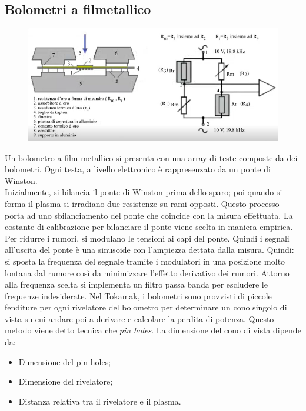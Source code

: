 \documentclass{article}
\begin{document}
\subsection{Bolometri a filmetallico}
\begin{figure}
    \centering
    \includegraphics[scale=0.4]{2022-06-21-16-35-03.png}%
\end{figure}
Un bolometro a film metallico si presenta con una array di teste composte da dei bolometri. Ogni testa, a livello elettronico è rappresenzato da un ponte di Winston.\\
Inizialmente, si bilancia il ponte di Winston prima dello sparo; poi quando si forma il plasma si irradiano due resistenze su rami opposti. Questo processo porta ad uno sbilanciamento del ponte che coincide con la misura effettuata. La costante di calibrazione per bilanciare il ponte viene scelta in maniera empirica.\newline
Per ridurre i rumori, si modulano le tensioni ai capi del ponte. Quindi i segnali all'uscita del ponte è una sinusoide con l'ampiezza dettata dalla misura. Quindi: si sposta la frequenza del segnale tramite i modulatori in una posizione molto lontana dal rumore così da minimizzare l'effetto derivativo dei rumori. Attorno alla frequenza scelta si implementa un filtro passa banda per escludere le frequenze indesiderate.\newline
Nel Tokamak, i bolometri sono provvisti di piccole fenditure per ogni rivelatore del bolometro per determinare un cono singolo di vista su cui andare poi a derivare e calcolare la perdita di potenza. Questo metodo viene detto tecnica che \emph{pin holes}. La dimensione del cono di vista dipende da:\begin{itemize}
    \item Dimensione del pin holes;
    \item Dimensione del rivelatore;
    \item Distanza relativa tra il rivelatore e il plasma.
\end{itemize}
\end{document}
